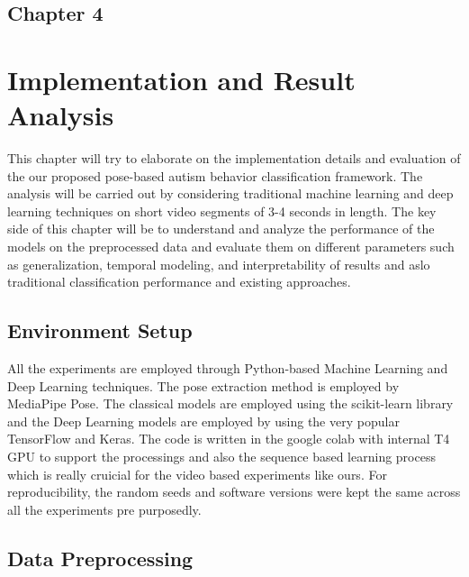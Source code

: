 
\begin{center}
    \section*{\fontsize{20}{20}\selectfont Chapter 4}
\end{center}
\vspace{10mm}

\section{Implementation and Result Analysis}

This chapter will try to elaborate on the implementation details and evaluation of the our proposed pose-based autism behavior classification framework. The analysis will be carried out by considering traditional machine learning and deep learning techniques on short video segments of 3-4 seconds in length. The key side of this chapter will be to understand and analyze the performance of the models on the preprocessed data and evaluate them on different parameters such as generalization, temporal modeling, and interpretability of results and aslo  traditional classification performance and existing approaches.

\subsection{Environment Setup}

All the experiments are employed through Python-based Machine Learning and Deep Learning techniques. The pose extraction method is employed by MediaPipe Pose. The classical models are employed using the scikit-learn library and the Deep Learning models are employed by using the very popular TensorFlow and Keras. The code is written in the google colab with internal T4 GPU to support the processings and also the sequence based learning process which is really cruicial for the video based experiments like ours. For reproducibility, the random seeds and software versions were kept the same across all the experiments pre purposedly.


\subsection{Data Preprocessing}

